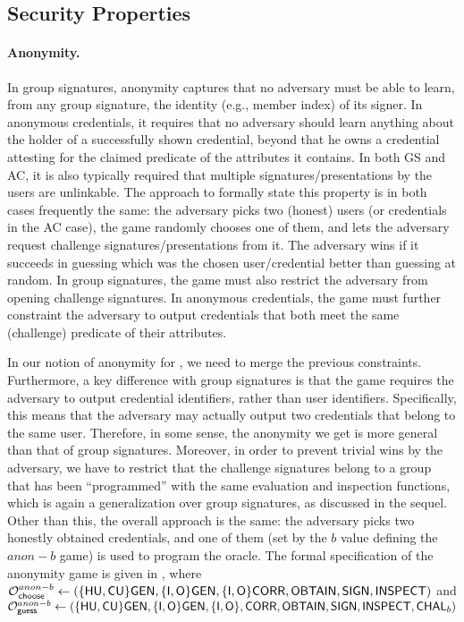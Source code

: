 \subsection{Security Properties}
\label{ssec:security}

\paragraph{Anonymity.} %
In group signatures, anonymity captures that no adversary must be able to learn,
from any group signature, the identity (e.g., member index) of its signer. In 
anonymous credentials, it requires that no adversary should learn anything about
the holder of a successfully shown credential, beyond that he owns a credential
attesting for the claimed predicate of the attributes it contains. In both GS
and AC, it is also typically required that
multiple signatures/presentations by the users are unlinkable. The approach to
formally state this property is in both cases frequently the same: the adversary
picks two (honest) users (or credentials in the AC case), the game randomly
chooses one of them, and lets the adversary request challenge
signatures/presentations from it. The adversary wins if it succeeds in guessing
which was the chosen user/credential better than guessing at random. In group
signatures, the game must also restrict the adversary from opening challenge
signatures. In anonymous credentials, the game must further constraint the
adversary to output credentials that both meet the same (challenge) predicate
of their attributes.

In our notion of anonymity for \UAS, we need to merge the previous constraints.
Furthermore, a key difference with group signatures is that the game requires
the adversary to output credential identifiers, rather than user identifiers.
Specifically, this means that the adversary may actually output two credentials
that belong to the same user. Therefore, in some sense, the anonymity we get is
more general than that of group signatures. Moreover, in order to prevent
trivial wins by the adversary, we have to restrict that the challenge signatures
belong to a group that has been ``programmed'' with the same evaluation and
inspection functions, which is again a generalization over group signatures,
as discussed in the sequel. Other than this, the overall approach is the same:
the adversary picks two honestly obtained credentials, and one of them (set
by the $b$ value defining the $anon-b$ game) is used to program the \CHALb
oracle. The formal specification of the anonymity game is
given in , where $\mathcal{O}^{anon-b}_{\mathsf{choose}} \gets (\lbrace\mathsf{HU},\mathsf{CU}\rbrace
\mathsf{GEN},\lbrace\mathsf{I},\mathsf{O}\rbrace\mathsf{GEN},\lbrace\mathsf{I},\mathsf{O}\rbrace\mathsf{CORR},\mathsf{OBTAIN},\mathsf{SIGN},
\mathsf{INSPECT})$ and $\mathcal{O}^{anon-b}_{\mathsf{guess}} \gets (\lbrace\mathsf{HU},\mathsf{CU}\rbrace\mathsf{GEN},\lbrace\mathsf{I},\mathsf{O}\rbrace
\mathsf{GEN},\lbrace\mathsf{I},\mathsf{O}\rbrace,\mathsf{CORR},\mathsf{OBTAIN},\mathsf{SIGN},\mathsf{INSPECT},\mathsf{CHAL}_b)$


